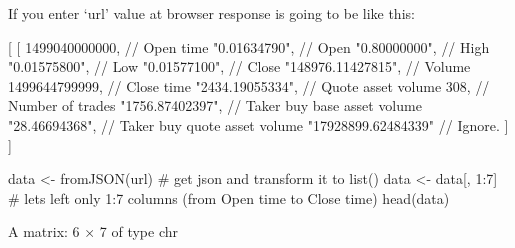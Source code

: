 \documentclass[
  letterpaper,
  DIV=11,
  numbers=noendperiod]{scrreprt}
\newenvironment{Shaded}{\begin{snugshade}}{\end{snugshade}}
\newcommand{\CommentTok}[1]{\textcolor[rgb]{0.37,0.37,0.37}{#1}}
\newcommand{\DecValTok}[1]{\textcolor[rgb]{0.68,0.00,0.00}{#1}}
\newcommand{\ErrorTok}[1]{\textcolor[rgb]{0.68,0.00,0.00}{#1}}
\newcommand{\FunctionTok}[1]{\textcolor[rgb]{0.28,0.35,0.67}{#1}}
\newcommand{\NormalTok}[1]{\textcolor[rgb]{0.00,0.23,0.31}{#1}}
\newcommand{\OtherTok}[1]{\textcolor[rgb]{0.00,0.23,0.31}{#1}}
\newcommand{\SpecialCharTok}[1]{\textcolor[rgb]{0.37,0.37,0.37}{#1}}
\newcommand{\StringTok}[1]{\textcolor[rgb]{0.13,0.47,0.30}{#1}}
\begin{document}
If you enter `url' value at browser response is going to be like this:

\begin{Shaded}
\begin{Highlighting}[]
\OtherTok{[}
  \OtherTok{[}
    \DecValTok{1499040000000}\OtherTok{,}      \ErrorTok{//} \ErrorTok{Open} \ErrorTok{time}
    \StringTok{"0.01634790"}\OtherTok{,}       \ErrorTok{//} \ErrorTok{Open}
    \StringTok{"0.80000000"}\OtherTok{,}       \ErrorTok{//} \ErrorTok{High}
    \StringTok{"0.01575800"}\OtherTok{,}       \ErrorTok{//} \ErrorTok{Low}
    \StringTok{"0.01577100"}\OtherTok{,}       \ErrorTok{//} \ErrorTok{Close}
    \StringTok{"148976.11427815"}\OtherTok{,}  \ErrorTok{//} \ErrorTok{Volume}
    \DecValTok{1499644799999}\OtherTok{,}      \ErrorTok{//} \ErrorTok{Close} \ErrorTok{time}
    \StringTok{"2434.19055334"}\OtherTok{,}    \ErrorTok{//} \ErrorTok{Quote} \ErrorTok{asset} \ErrorTok{volume}
    \DecValTok{308}\OtherTok{,}                \ErrorTok{//} \ErrorTok{Number} \ErrorTok{of} \ErrorTok{trades}
    \StringTok{"1756.87402397"}\OtherTok{,}    \ErrorTok{//} \ErrorTok{Taker} \ErrorTok{buy} \ErrorTok{base} \ErrorTok{asset} \ErrorTok{volume}
    \StringTok{"28.46694368"}\OtherTok{,}      \ErrorTok{//} \ErrorTok{Taker} \ErrorTok{buy} \ErrorTok{quote} \ErrorTok{asset} \ErrorTok{volume}
    \StringTok{"17928899.62484339"} \ErrorTok{//} \ErrorTok{Ignore.}
  \OtherTok{]}
\OtherTok{]}
\end{Highlighting}
\end{Shaded}

\begin{Shaded}
\begin{Highlighting}[]
\NormalTok{data }\OtherTok{\textless{}{-}} \FunctionTok{fromJSON}\NormalTok{(url) }\CommentTok{\# get json and transform it to list()}
\NormalTok{data }\OtherTok{\textless{}{-}}\NormalTok{ data[, }\DecValTok{1}\SpecialCharTok{:}\DecValTok{7}\NormalTok{] }\CommentTok{\# let\textquotesingle{}s left only 1:7 columns (from Open time to Close time)}
\FunctionTok{head}\NormalTok{(data)}
\end{Highlighting}
\end{Shaded}

A matrix: 6 × 7 of type chr
\end{document}
